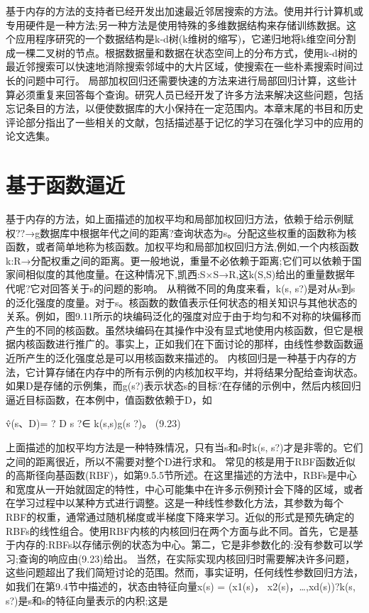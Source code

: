 {基于内存的方法的支持者已经开发出加速最近邻居搜索的方法。使用并行计算机或专用硬件是一种方法;另一种方法是使用特殊的多维数据结构来存储训练数据。这个应用程序研究的一个数据结构是k-d树(k维树的缩写)，它递归地将k维空间分割成一棵二叉树的节点。根据数据量和数据在状态空间上的分布方式，使用k-d树的最近邻搜索可以快速地消除搜索邻域中的大片区域，使搜索在一些朴素搜索时间过长的问题中可行。
局部加权回归还需要快速的方法来进行局部回归计算，这些计算必须重复来回答每个查询。研究人员已经开发了许多方法来解决这些问题，包括忘记条目的方法，以便使数据库的大小保持在一定范围内。本章末尾的书目和历史评论部分指出了一些相关的文献，包括描述基于记忆的学习在强化学习中的应用的论文选集。


\section{基于函数逼近}

基于内存的方法，如上面描述的加权平均和局部加权回归方法，依赖于给示例赋权??→g数据库中根据年代之间的距离?查询状态为s。分配这些权重的函数称为核函数，或者简单地称为核函数。加权平均和局部加权回归方法,例如,一个内核函数k:R→分配权重之间的距离。更一般地说，重量不必依赖于距离;它们可以依赖于国家间相似度的其他度量。在这种情况下,凯西:S×S→R,这k(S,S)给出的重量数据年代呢?它对回答关于s的问题的影响。
从稍微不同的角度来看，k(s, s?)是对从s到s的泛化强度的度量。对于s。核函数的数值表示任何状态的相关知识与其他状态的关系。例如，图9.11所示的块编码泛化的强度对应于由于均匀和不对称的块偏移而产生的不同的核函数。虽然块编码在其操作中没有显式地使用内核函数，但它是根据内核函数进行推广的。事实上，正如我们在下面讨论的那样，由线性参数函数逼近所产生的泛化强度总是可以用核函数来描述的。
内核回归是一种基于内存的方法，它计算存储在内存中的所有示例的内核加权平均，并将结果分配给查询状态。如果D是存储的示例集，而g(s?)表示状态s的目标?在存储的示例中，然后内核回归逼近目标函数，在本例中，值函数依赖于D，如

v̂(s、D)= ?
D s ?∈
k(s,s)g(s ?)。 					(9.23)

上面描述的加权平均方法是一种特殊情况，只有当s和s时k(s, s?)才是非零的。它们之间的距离很近，所以不需要对整个D进行求和。
常见的核是用于RBF函数近似的高斯径向基函数(RBF)，如第9.5.5节所述。在这里描述的方法中，RBFs是中心和宽度从一开始就固定的特性，中心可能集中在许多示例预计会下降的区域，或者在学习过程中以某种方式进行调整。这是一种线性参数化方法，其参数为每个RBF的权重，通常通过随机梯度或半梯度下降来学习。近似的形式是预先确定的RBFs的线性组合。使用RBF内核的内核回归在两个方面与此不同。首先，它是基于内存的:RBFs以存储示例的状态为中心。第二，它是非参数化的:没有参数可以学习;查询的响应由(9.23)给出。
当然，在实际实现内核回归时需要解决许多问题，这些问题超出了我们简短讨论的范围。然而，事实证明，任何线性参数回归方法，如我们在第9.4节中描述的，状态由特征向量x(s) = (x1(s)， x2(s)，…,xd(s))?k(s, s?)是s和s的特征向量表示的内积;这是

}

